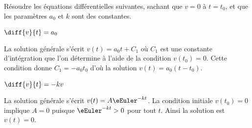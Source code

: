 \hauteurLargeurCadreReponse		{10mm}{7cm}
\initialisationEntrainement

Résoudre les équations différentielles suivantes, sachant que $v=0$ à $t=t_0$, et que les paramètres $a_0$ et $k$ sont des constantes.

\debutEntrainement


\begin{enonce}
	$\diff{v}{t} =  a_0$
\end{enonce}


\begin{corrige}
La solution générale s'écrit $v(t)=a_0t+C_1$ où $C_1$ est une constante d'intégration que l'on détermine à l'aide de la condition $v(t_0)=0$. Cette condition donne $C_1=-a_0t_0$ d'où la solution $v(t)=a_0(t-t_0)$.
\end{corrige}

\begin{enonce}
	$\diff{v}{t} = -kv$
\end{enonce}


\begin{corrige}
La solution générale s'écrit $v(t) = A\eEuler^{-kt}$. La condition initiale $v(t_0)=0$ implique $A=0$ puisque $\eEuler^{-kt}>0$ pour tout $t$. Ainsi la solution est $v(t)=0$.
\end{corrige}

